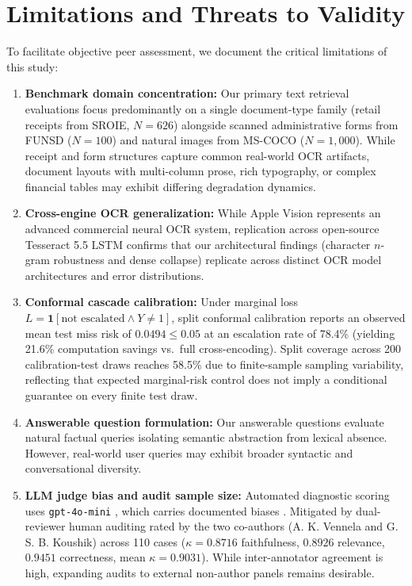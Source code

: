 \documentclass[conference]{IEEEtran}
\begin{document}
\section{Limitations and Threats to Validity}
\label{sec:limitations}
To facilitate objective peer assessment, we document the critical limitations of this study:
\begin{enumerate}
    \setlength{\itemsep}{0.2pt plus 0.1pt}
    \setlength{\parsep}{0pt}
    \setlength{\parskip}{0pt}
    \item \textbf{Benchmark domain concentration:} Our primary text retrieval evaluations focus predominantly on a single document-type family (retail receipts from SROIE, $N=626$) alongside scanned administrative forms from FUNSD ($N=100$) and natural images from MS-COCO ($N=1{,}000$). While receipt and form structures capture common real-world OCR artifacts, document layouts with multi-column prose, rich typography, or complex financial tables may exhibit differing degradation dynamics.
    \item \textbf{Cross-engine OCR generalization:} While Apple Vision represents an advanced commercial neural OCR system, replication across open-source Tesseract 5.5 LSTM confirms that our architectural findings (character $n$-gram robustness and dense collapse) replicate across distinct OCR model architectures and error distributions.
    \item \textbf{Conformal cascade calibration:} Under marginal loss $L = \mathbf{1}[\text{not escalated} \land Y \ne 1]$, split conformal calibration reports an observed mean test miss risk of $0.0494 \le 0.05$ at an escalation rate of 78.4\% (yielding 21.6\% computation savings vs.\ full cross-encoding). Split coverage across 200 calibration-test draws reaches 58.5\% due to finite-sample sampling variability, reflecting that expected marginal-risk control does not imply a conditional guarantee on every finite test draw.
    \item \textbf{Answerable question formulation:} Our answerable questions evaluate natural factual queries isolating semantic abstraction from lexical absence. However, real-world user queries may exhibit broader syntactic and conversational diversity.
    \item \textbf{LLM judge bias and audit sample size:} Automated diagnostic scoring uses \texttt{gpt-4o-mini} \cite{openai2024gpt4o}, which carries documented biases \cite{zheng2023judging}. Mitigated by dual-reviewer human auditing rated by the two co-authors (A. K. Vennela and G. S. B. Koushik) across 110 cases ($\kappa = 0.8716$ faithfulness, $0.8926$ relevance, $0.9451$ correctness, mean $\kappa = 0.9031$). While inter-annotator agreement is high, expanding audits to external non-author panels remains desirable.

\end{enumerate}
\end{document}
